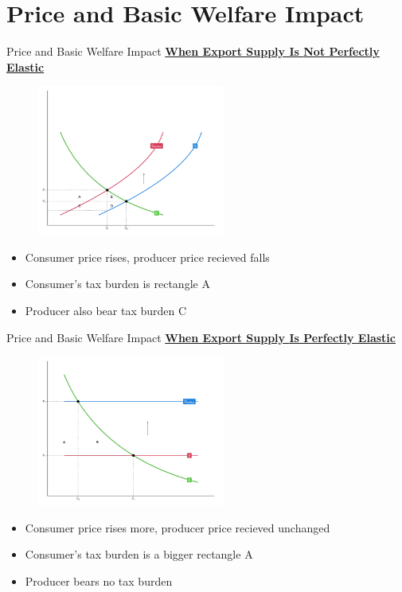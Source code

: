 \documentclass{beamer}
\begin{document}
\section{Price and Basic Welfare Impact}
\begin{frame}{Price and Basic Welfare Impact}
    \underline{\textbf{When Export Supply Is {\color{red}Not} Perfectly Elastic}}
    \begin{figure}[H]
        \centering
        \includegraphics[width=0.55\textwidth]{tariff_welfare.png}
    \end{figure}
    \begin{itemize}
        \item Consumer price {\color{red}rises,} producer price recieved {\color{red}falls}
        \item Consumer's tax burden is rectangle A
        \item {\color{red}Producer also bear tax burden C}
    \end{itemize}
\end{frame}

\begin{frame}{Price and Basic Welfare Impact}
    \underline{\textbf{When Export Supply {\color{red}Is Perfectly Elastic}}}
    \begin{figure}[H]
        \centering
        \includegraphics[width=0.55\textwidth]{Tariff_welfare_flat.png}
    \end{figure}
    \begin{itemize}
        \item Consumer price {\color{red}rises more,} producer price recieved {\color{red}unchanged}
        \item Consumer's tax burden is a {\color{red}bigger} rectangle A
        \item {\color{red}Producer bears no tax burden}
    \end{itemize}
\end{frame}
\end{document}
